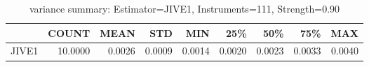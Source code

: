 \begin{table}[ht]
\centering
\caption{variance summary: Estimator=JIVE1, Instruments=111, Strength=0.90}
\begin{tabular}{lrrrrrrrr}
\toprule
 & COUNT & MEAN & STD & MIN & 25\% & 50\% & 75\% & MAX \\
\midrule
JIVE1 & 10.0000 & 0.0026 & 0.0009 & 0.0014 & 0.0020 & 0.0023 & 0.0033 & 0.0040 \\
\bottomrule
\end{tabular}
\end{table}
